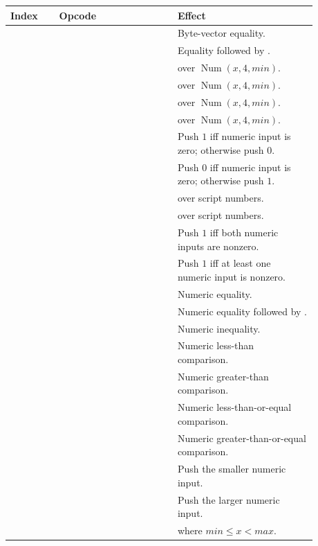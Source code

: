 \begin{longtable}{@{}L{0.14\linewidth}L{0.34\linewidth}L{0.40\linewidth}@{}}
\toprule
Index & Opcode & Effect \\
\midrule
{} &  & Byte-vector equality. \\
 &  & Equality followed by . \\
 &  &  over \(\operatorname{Num}(x,4,min)\). \\
 &  &  over \(\operatorname{Num}(x,4,min)\). \\
 &  &  over \(\operatorname{Num}(x,4,min)\). \\
 &  &  over \(\operatorname{Num}(x,4,min)\). \\
 &  & Push \(1\) iff numeric input is zero; otherwise push \(0\). \\
 &  & Push \(0\) iff numeric input is zero; otherwise push \(1\). \\
 &  &  over script numbers. \\
 &  &  over script numbers. \\
 &  & Push \(1\) iff both numeric inputs are nonzero. \\
 &  & Push \(1\) iff at least one numeric input is nonzero. \\
 &  & Numeric equality. \\
 &  & Numeric equality followed by . \\
 &  & Numeric inequality. \\
 &  & Numeric less-than comparison. \\
 &  & Numeric greater-than comparison. \\
 &  & Numeric less-than-or-equal comparison. \\
 &  & Numeric greater-than-or-equal comparison. \\
 &  & Push the smaller numeric input. \\
 &  & Push the larger numeric input. \\
 &  &  where \(min \le x < max\). \\
\bottomrule
\end{longtable}

